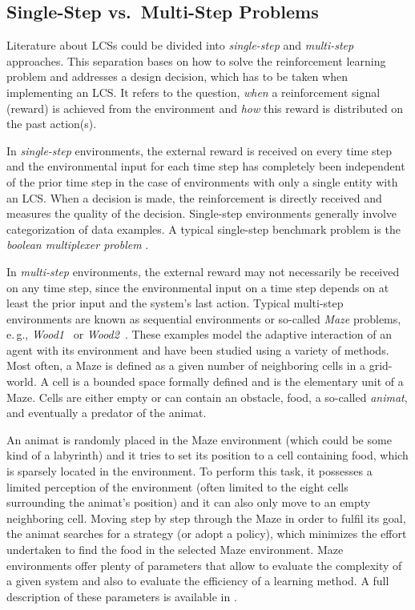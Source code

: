 \subsection{Single-Step vs.\ Multi-Step Problems}
\label{subsection:single-step-vs-multi-step-problems}

Literature about LCSs could be divided into \emph{single-step} and \emph{mul\-ti-step} approaches. This separation bases on how to solve the reinforcement learning problem and addresses a design decision, which has to be taken when implementing an LCS. It refers to the question, \emph{when} a reinforcement signal (reward) is achieved from the environment and \emph{how} this reward is distributed on the past action(s). 

In \emph{single-step} environments, the external reward is received on every time step and the environmental input for each time step has completely been independent of the prior time step in the case of environments with only a single entity with an LCS. When a decision is made, the reinforcement is directly received and measures the quality of the decision. Single-step environments generally involve categorization of data examples. A typical single-step benchmark problem is the \emph{boolean multiplexer problem} \cite{BKLW04,Wil95}. 

In \emph{multi-step} environments, the external reward may not necessarily be received on any time step, since the environmental input on a time step depends on at least the prior input and the system's last action. Typical multi-step environments are known as sequential environments or so-called \emph{Maze} problems, e.\,g., \emph{Wood1}~\cite{Wil94} or \emph{Wood2}~\cite{Wil95}. These examples model the adaptive interaction of an agent with its environment and have been studied using a variety of methods. Most often, a Maze is defined as a given number of neighboring cells in a grid-world. A cell is a bounded space formally defined and is the elementary unit of a Maze. Cells are either empty or can contain an obstacle, food, a so-called \emph{animat}, and eventually a predator of the animat. 

An animat is randomly placed in the Maze environment (which could be some kind of a labyrinth) and it tries to set its position to a cell containing food, which is sparsely located in the environment. To perform this task, it possesses a limited perception of the environment (often limited to the eight cells surrounding the animat's position) and it can also only move to an empty neighboring cell. Moving step by step through the Maze in order to fulfil its goal, the animat searches for a strategy (or adopt a policy), which minimizes the effort undertaken to find the food in the selected Maze environment. Maze environments offer plenty of parameters that allow to evaluate the complexity of a given system and also to evaluate the efficiency of a learning method. A full description of these parameters is available in \cite{BZ05}.

